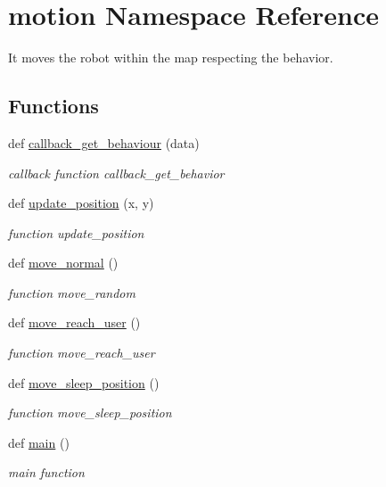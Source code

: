 \hypertarget{namespacemotion}{}\section{motion Namespace Reference}
\label{namespacemotion}


It moves the robot within the map respecting the behavior.  


\subsection*{Functions}
\begin{DoxyCompactItemize}
\item 
def \hyperlink{namespacemotion_a223e65905edcd5f4605198efb23d2ca3}{callback\+\_\+get\+\_\+behaviour} (data)
\begin{DoxyCompactList}\small\item\em callback function callback\+\_\+get\+\_\+behavior \end{DoxyCompactList}\item 
def \hyperlink{namespacemotion_a9a93c5fd6c8938302c99cdc865f34cb8}{update\+\_\+position} (x, y)
\begin{DoxyCompactList}\small\item\em function update\+\_\+position \end{DoxyCompactList}\item 
def \hyperlink{namespacemotion_ab5144d84b423263e4fa8c03c453d975c}{move\+\_\+normal} ()
\begin{DoxyCompactList}\small\item\em function move\+\_\+random \end{DoxyCompactList}\item 
def \hyperlink{namespacemotion_ab22dd13019d977ca14ccf9a84d7f224a}{move\+\_\+reach\+\_\+user} ()
\begin{DoxyCompactList}\small\item\em function move\+\_\+reach\+\_\+user \end{DoxyCompactList}\item 
def \hyperlink{namespacemotion_a7e28371ac015cdd23c39095626abce98}{move\+\_\+sleep\+\_\+position} ()
\begin{DoxyCompactList}\small\item\em function move\+\_\+sleep\+\_\+position \end{DoxyCompactList}\item 
def \hyperlink{namespacemotion_ad6289fca8572f5af95fd28f4c2dbc68d}{main} ()
\begin{DoxyCompactList}\small\item\em main function \end{DoxyCompactList}\end{DoxyCompactItemize}
